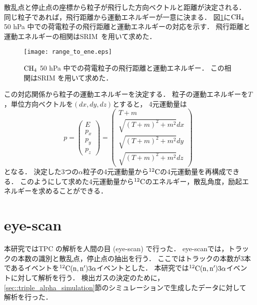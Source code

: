 \documentclass[../master]{subfiles}
\begin{document}
散乱点と停止点の座標から粒子が飛行した方向ベクトルと距離が決定される．
同じ粒子であれば，飛行距離から運動エネルギーが一意に決まる．
図\ref{fig::range_to_ene_alpha}に$\rm CH_{4}$ 50 hPa 中での荷電粒子の飛行距離と運動エネルギーの対応を示す．
飛行距離と運動エネルギーの相関はSRIM~\cite{srim}を用いて求めた．
\begin{figure}
  \centering
  \texttt{[image: range\_to\_ene.eps]}
  \caption[$\rm CH_{4}$ 50 hPa 中での荷電粒子の飛行距離と運動エネルギー．]
          {$\rm CH_{4}$ 50 hPa 中での荷電粒子の飛行距離と運動エネルギー．
            この相関はSRIM を用いて求めた．
          }
  \label{fig::range_to_ene_alpha}
\end{figure}
この対応関係から粒子の運動エネルギーを決定する．
粒子の運動エネルギーを$T$，単位方向ベクトルを$(dx, dy, dz)$とすると，
4元運動量は
\begin{equation}
  p =
  \begin{pmatrix}
    E \\ p_{x} \\ p_{y} \\ p_{z}
  \end{pmatrix}
  =
  \begin{pmatrix}
    T + m \\ \sqrt{(T+m)^2 + m^2} dx \\ \sqrt{(T+m)^2 + m^2} dy \\ \sqrt{(T+m)^2 + m^2} dz
  \end{pmatrix}
  \label{eq::momentum_vector}
\end{equation}
となる．
決定した3つの$\alpha$粒子の4元運動量から${}^{12}{\rm C}$の4元運動量を再構成できる．
このようにして求めた4元運動量から${}^{12}{\rm C}$のエネルギー，散乱角度，励起エネルギーを求めることができる．


\section{eye-scan}
本研究ではTPC の解析を人間の目 (eye-scan) で行った．
eye-scanでは，トラックの本数の識別と散乱点，停止点の抽出を行う．
ここではトラックの本数が3本であるイベントを${}^{12}{\rm C}({\rm n},{\rm n}')3\alpha$イベントとした．
本研究では${}^{12}{\rm C}({\rm n},{\rm n}')3\alpha$イベントに対して解析を行う．
検出ガスの決定のために，\ref{sec::triple_alpha_simulation}節のシミュレーションで生成したデータに対して解析を行った．
\end{document}
